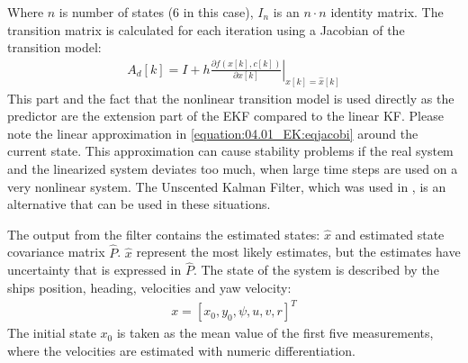 
Where \(n\) is number of states (6 in this case), \(I_n\) is an \(n \cdot n\) identity matrix.
The transition matrix is calculated for each iteration using a Jacobian of the transition model:
\begin{equation}\label{equation:04.01_EK:eqjacobi}
\begin{split}A_d[k] = I + h \left. \frac{\partial f \left(x[k],c[k] \right)}{\partial x[k]} \right|_{x[k]=\hat{x}[k]}\end{split}
\end{equation}
\sphinxAtStartPar
This part and the fact that the nonlinear transition model is used directly as the predictor are the extension part of the EKF compared to the linear KF. Please note the linear approximation in \autoref{equation:04.01_EK:eqjacobi} around the current state. This approximation can cause stability problems if the real system and the linearized system deviates too much, when large time steps are used on a very nonlinear system. The Unscented Kalman Filter, which was used in \cite{revestido_herrero_two-step_2012}, is an alternative that can be used in these situations.

\sphinxAtStartPar
The output from the filter contains the estimated states: \(\hat{x}\) and estimated state covariance matrix \(\hat{P}\). \(\hat{x}\) represent the most likely estimates, but the estimates have uncertainty that is expressed in \(\hat{P}\).
The state of the system is described by the ships position, heading, velocities and yaw velocity:
\begin{equation}\label{equation:04.01_EK:eqstates}
\begin{split}x = [x_0,y_0,\psi,u,v,r]^T\end{split}
\end{equation}
\sphinxAtStartPar
The initial state \(x_0\) is taken as the mean value of the first five measurements, where the velocities are estimated with numeric differentiation.

